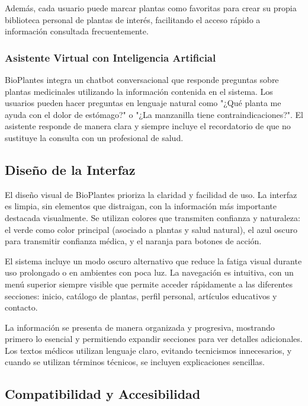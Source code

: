 \documentclass[12pt,a4paper]{article}
\begin{document}
Además, cada usuario puede marcar plantas como favoritas para crear su propia biblioteca personal de plantas de interés, facilitando el acceso rápido a información consultada frecuentemente.

\subsubsection{Asistente Virtual con Inteligencia Artificial}

BioPlantes integra un chatbot conversacional que responde preguntas sobre plantas medicinales utilizando la información contenida en el sistema. Los usuarios pueden hacer preguntas en lenguaje natural como "¿Qué planta me ayuda con el dolor de estómago?" o "¿La manzanilla tiene contraindicaciones?". El asistente responde de manera clara y siempre incluye el recordatorio de que no sustituye la consulta con un profesional de salud.

\subsection{Diseño de la Interfaz}

El diseño visual de BioPlantes prioriza la claridad y facilidad de uso. La interfaz es limpia, sin elementos que distraigan, con la información más importante destacada visualmente. Se utilizan colores que transmiten confianza y naturaleza: el verde como color principal (asociado a plantas y salud natural), el azul oscuro para transmitir confianza médica, y el naranja para botones de acción.

El sistema incluye un modo oscuro alternativo que reduce la fatiga visual durante uso prolongado o en ambientes con poca luz. La navegación es intuitiva, con un menú superior siempre visible que permite acceder rápidamente a las diferentes secciones: inicio, catálogo de plantas, perfil personal, artículos educativos y contacto.

La información se presenta de manera organizada y progresiva, mostrando primero lo esencial y permitiendo expandir secciones para ver detalles adicionales. Los textos médicos utilizan lenguaje claro, evitando tecnicismos innecesarios, y cuando se utilizan términos técnicos, se incluyen explicaciones sencillas.

\subsection{Compatibilidad y Accesibilidad}
\end{document}

